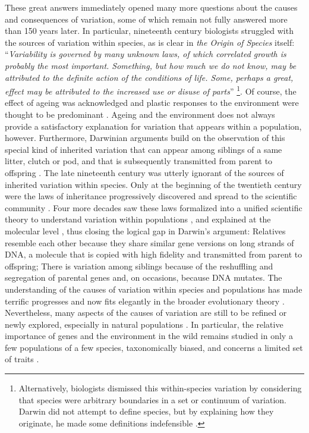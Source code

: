These great answers immediately opened many more questions about the causes and consequences of variation, some of which remain not fully answered more than 150 years later. In particular, nineteenth century biologists struggled with the sources of variation within species, as is clear in \emph{the Origin of Species} itself:  ``\emph{Variability is governed by many unknown laws, of which correlated growth is probably the most important. Something, but how much we do not know, may be attributed to the definite action of the conditions of life. Some, perhaps a great, effect may be attributed to the increased use or disuse of parts}'' \parencite[p. 31][]{Darwin1859} \footnote{Alternatively, biologists dismissed this within-species variation by considering that species were arbitrary boundaries in a set or continuum of variation. Darwin did not attempt to define species, but by explaining how they originate, he made some definitions indefensible \parencite[][pp. 129-163]{Wilkins2009}.}. Of course, the effect of ageing was acknowledged and plastic responses to the environment were thought to be predominant \parencite{Wilkins2009}. Ageing and the environment does not always provide a satisfactory explanation for variation that appears within a population, however.
Furthermore, Darwinian arguments build on the observation of this special kind of inherited variation that can appear among siblings of a same litter, clutch or pod, and that is subsequently transmitted from parent to offspring \parencite[][Chapter 1]{Darwin1859}. The late nineteenth century was utterly ignorant of the sources of inherited variation within species. Only at the beginning of the twentieth century were the laws of inheritance progressively discovered and spread to the scientific community \parencite{Dietrich2006}. Four more decades saw these laws formalized into a unified scientific theory to understand variation within populations \parencite{Fisher1930}, and explained at the molecular level \parencite{Oswald1943, Watson1953}, thus closing the logical gap in Darwin's argument: Relatives resemble each other because they share similar gene versions on long strands of DNA, a molecule that is copied with high fidelity and transmitted from parent to offspring; There is variation among siblings because of the reshuffling and segregation of parental genes and, on occasions, because DNA mutates. 
The understanding of the causes of variation within species and populations has made terrific progresses and now fits elegantly in the broader evolutionary theory \parencite{Pigliucci2010}. Nevertheless, many aspects of the causes of variation are still to be refined or newly explored, especially in natural populations \parencite{Kruuk2014}. In particular, the relative importance of genes and the environment in the wild remains studied in only a few populations of a few species, taxonomically biased, and concerns a limited set of traits \parencite{Lynch1998, Postma2014}. 

